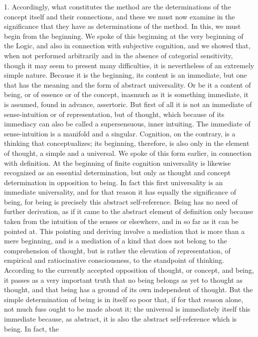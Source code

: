 1. Accordingly, what constitutes the method are the determinations of
the concept itself and their connections, and these we must now examine
in the significance that they have as determinations of the method.
In this, we must begin from the beginning.
We spoke of this beginning at
the very beginning of the Logic,
and also in connection with subjective
cognition,
 and we showed that, when not performed arbitrarily and in
the absence of categorial sensitivity,
though it may seem to present many difficulties,
it is nevertheless of an extremely simple nature.
Because it is the beginning, its content is an immediate,
but one that has the meaning and the form of abstract universality.
Or be it a content of being, or of essence or
of the concept, inasmuch as it is something immediate, it is assumed, found in
advance, assertoric.
 But first of all it is not an immediate of sense-intuition or
of representation, but of thought, which because of its immediacy can also be
called a supersensuous, inner intuiting. The immediate of sense-intuition
is a manifold and a singular. Cognition, on the contrary, is a thinking that
conceptualizes; its beginning, therefore, is also only in the element of thought,
a simple and a universal.
 We spoke of this form earlier, in connection with
definition. At the beginning of finite cognition universality is likewise
recognized as an essential determination, but only as thought
 and concept
determination in opposition to being. In fact this first universality is an
immediate universality, and for that reason it has equally the significance of
being, for being is precisely this abstract self-reference. Being has no need
of further derivation, as if it came to the abstract element of definition
only because taken from the intuition of the senses or elsewhere, and
in so far as it can be pointed at. This pointing and deriving involve a
mediation that is more than a mere beginning, and is a mediation of a kind
that does not belong to the comprehension of thought, but is rather the
elevation of representation, of empirical and ratiocinative consciousness, to
the standpoint of thinking. According to the currently accepted opposition
of thought, or concept, and being, it passes as a very important truth that
no being belongs as yet to thought as thought, and that being has a ground
of its own independent of thought. But the simple determination of being
is in itself so poor that, if for that reason alone, not much fuss ought to be
made about it; the universal is immediately itself this immediate because,
as abstract, it is also the abstract self-reference which is being. In fact, the

